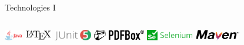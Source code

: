 \documentclass[
    ngerman,%
    authorontitle=true,
]{bfhbeamer}
\begin{document}
\begin{frame}{Technologies I}
\begin{columns}
            \begin{column}{0.3\textwidth}
                \includegraphics[height=0.5cm]{pictures/Java-Logo}
                \vspace{1em}
                \includegraphics[height=0.5cm]{pictures/LaTeX_logo}
                \vspace{1em}
                \includegraphics[height=0.5cm]{pictures/JUnit_5_Logo}
                \vspace{1em}
                \includegraphics[height=0.5cm]{pictures/Apache_PDFBox_logo}
                \vspace{1em}
                \includegraphics[height=0.5cm]{pictures/Selenium_logo}
                \vspace{1em}
                \includegraphics[height=0.5cm]{pictures/Apache_Maven_logo}
            \end{column}
        \end{columns}
    \end{frame}
\end{document}
